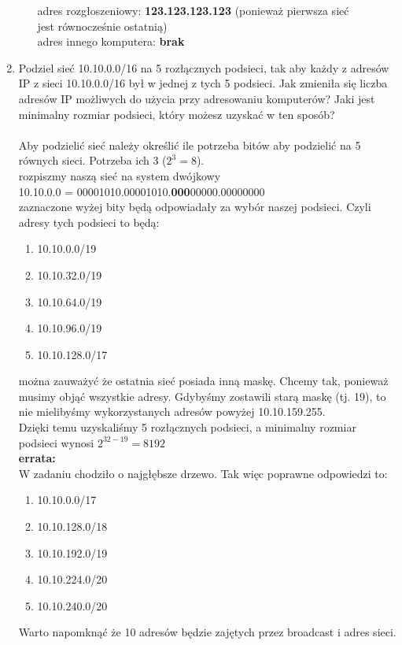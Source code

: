 \documentclass{article}[A4]
\begin{document}
\begin{enumerate}
\begin{itemize}[label=$\blacktriangleright$]
	\null \quad adres rozgłoszeniowy: \textbf{123.123.123.123} (ponieważ pierwsza sieć \\ \null \quad jest równocześnie ostatnią)\\
	\null \quad adres innego komputera: \textbf{brak}\\
		\end{itemize}
	\item{Podziel sieć 10.10.0.0/16 na 5 rozłącznych podsieci, tak aby każdy z adresów IP z sieci 10.10.0.0/16
był w jednej z tych 5 podsieci. Jak zmieniła się liczba adresów IP możliwych do użycia przy adresowaniu komputerów? Jaki jest minimalny rozmiar podsieci, który możesz uzyskać w ten sposób?}\\\\
Aby podzielić sieć należy określić ile potrzeba bitów aby podzielić na 5 równych sieci. Potrzeba ich 3 ($2^3 = 8$).\\
rozpiszmy naszą sieć na system dwójkowy\\
10.10.0.0 = 00001010.00001010.\textbf{000}00000.00000000\\
zaznaczone wyżej bity będą odpowiadały za wybór naszej podsieci. Czyli adresy tych podsieci to będą:
\begin{enumerate}
	\item 10.10.0.0/19
	\item 10.10.32.0/19
	\item 10.10.64.0/19
	\item 10.10.96.0/19
	\item 10.10.128.0/17
\end{enumerate}
można zauważyć że ostatnia sieć posiada inną maskę. Chcemy tak, ponieważ musimy objąć wszystkie adresy. Gdybyśmy zostawili starą maskę (tj. 19), to nie mielibyśmy wykorzystanych adresów powyżej 10.10.159.255.\\
Dzięki temu uzyskaliśmy 5 rozłącznych podsieci, a minimalny rozmiar podsieci wynosi $2^{32-19} = 8192$\\
\textbf{errata:}\\
W zadaniu chodziło o najgłębsze drzewo. Tak więc poprawne odpowiedzi to:
\begin{enumerate}
	\item 10.10.0.0/17
	\item 10.10.128.0/18
	\item 10.10.192.0/19
	\item 10.10.224.0/20
	\item 10.10.240.0/20
\end{enumerate}
Warto napomknąć że 10 adresów będzie zajętych przez broadcast i adres sieci.\\

\end{enumerate}
\end{document}
